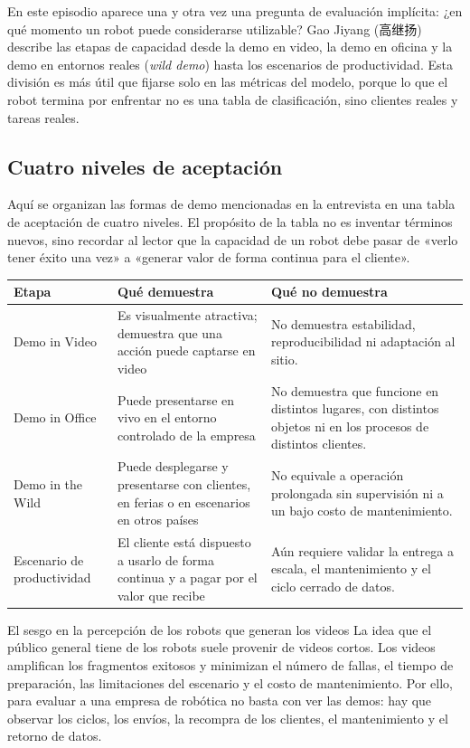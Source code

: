 \documentclass[a4paper]{article}
\begin{document}
En este episodio aparece una y otra vez una pregunta de evaluación implícita: ¿en qué momento un robot puede considerarse utilizable? Gao Jiyang (高继扬) describe las etapas de capacidad desde la demo en video, la demo en oficina y la demo en entornos reales (\emph{wild demo}) hasta los escenarios de productividad. Esta división es más útil que fijarse solo en las métricas del modelo, porque lo que el robot termina por enfrentar no es una tabla de clasificación, sino clientes reales y tareas reales.

\subsection{Cuatro niveles de aceptación}

Aquí se organizan las formas de demo mencionadas en la entrevista en una tabla de aceptación de cuatro niveles. El propósito de la tabla no es inventar términos nuevos, sino recordar al lector que la capacidad de un robot debe pasar de «verlo tener éxito una vez» a «generar valor de forma continua para el cliente».

\begin{longtable}{p{}p{}p{}}
\toprule
Etapa & Qué demuestra & Qué no demuestra \\
\midrule
Demo in Video & Es visualmente atractiva; demuestra que una acción puede captarse en video & No demuestra estabilidad, reproducibilidad ni adaptación al sitio. \\
Demo in Office & Puede presentarse en vivo en el entorno controlado de la empresa & No demuestra que funcione en distintos lugares, con distintos objetos ni en los procesos de distintos clientes. \\
Demo in the Wild & Puede desplegarse y presentarse con clientes, en ferias o en escenarios en otros países & No equivale a operación prolongada sin supervisión ni a un bajo costo de mantenimiento. \\
Escenario de productividad & El cliente está dispuesto a usarlo de forma continua y a pagar por el valor que recibe & Aún requiere validar la entrega a escala, el mantenimiento y el ciclo cerrado de datos. \\
\bottomrule
\end{longtable}

\begin{warningbox}{El sesgo en la percepción de los robots que generan los videos}
La idea que el público general tiene de los robots suele provenir de videos cortos. Los videos amplifican los fragmentos exitosos y minimizan el número de fallas, el tiempo de preparación, las limitaciones del escenario y el costo de mantenimiento. Por ello, para evaluar a una empresa de robótica no basta con ver las demos: hay que observar los ciclos, los envíos, la recompra de los clientes, el mantenimiento y el retorno de datos.
\end{warningbox}
\end{document}
